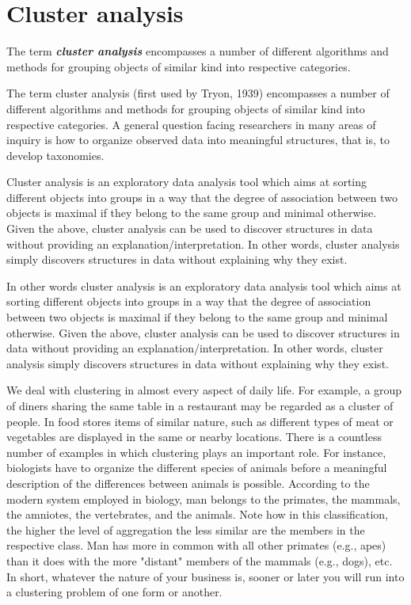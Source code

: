 \documentclass[a4paper,12pt]{article}
\begin{document}
\section{Cluster analysis}
The term \textit{\textbf{cluster analysis }}encompasses a number of different algorithms and methods for grouping objects of similar kind into respective categories.

The term cluster analysis (first used by Tryon, 1939) encompasses a number of different algorithms and methods for grouping objects of similar kind into respective categories. A general question facing researchers in many areas of inquiry is how to organize observed data into meaningful structures, that is, to develop taxonomies. 

Cluster analysis is an exploratory data analysis tool which aims at sorting different objects into groups in a way that the degree of association between two objects is maximal if they belong to the same group and minimal otherwise. Given the above, cluster analysis can be used to discover structures in data without providing an explanation/interpretation. In other words, cluster analysis simply discovers structures in data without explaining why they exist.

In other words cluster analysis is an exploratory data analysis tool which aims at sorting different objects into groups in a way that the degree of association between two objects is maximal if they belong to the same group and minimal otherwise. Given the above, cluster analysis can be used to discover structures in data without providing an explanation/interpretation. In other words, cluster analysis simply discovers structures in data without explaining why they exist.


We deal with clustering in almost every aspect of daily life. For example, a group of diners sharing the same table in a restaurant may be regarded as a cluster of people. In food stores items of similar nature, such as different types of meat or vegetables are displayed in the same or nearby locations. There is a countless number of examples in which clustering plays an important role. For instance, biologists have to organize the different species of animals before a meaningful description of the differences between animals is possible. According to the modern system employed in biology, man belongs to the primates, the mammals, the amniotes, the vertebrates, and the animals. Note how in this classification, the higher the level of aggregation the less similar are the members in the respective class. Man has more in common with all other primates (e.g., apes) than it does with the more "distant" members of the mammals (e.g., dogs), etc. In short, whatever the nature of your business is, sooner or later you will run into a clustering problem of one form or another.
\end{document}
